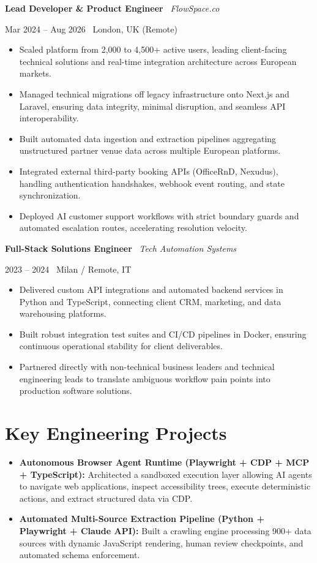 \documentclass[a4paper,10pt]{article}
\newcommand{\role}[4]{%
  \vspace{2pt}\noindent
  \begin{minipage}[t]{0.70\textwidth}\raggedright\textbf{#1} \textbullet\ \textit{#3}\end{minipage}%
  \hfill
  \begin{minipage}[t]{0.28\textwidth}\raggedleft\footnotesize\color{gray}#2 \textbullet\ #4\end{minipage}%
  \vspace{1pt}%
}
\begin{document}
\vspace{3pt}
\role{Lead Developer \& Product Engineer}{Mar 2024 -- Aug 2026}{FlowSpace.co}{London, UK (Remote)}
\begin{itemize}
  \item Scaled platform from 2,000 to 4,500+ active users, leading client-facing technical solutions and real-time integration architecture across European markets.
  \item Managed technical migrations off legacy infrastructure onto Next.js and Laravel, ensuring data integrity, minimal disruption, and seamless API interoperability.
  \item Built automated data ingestion and extraction pipelines aggregating unstructured partner venue data across multiple European platforms.
  \item Integrated external third-party booking APIs (OfficeRnD, Nexudus), handling authentication handshakes, webhook event routing, and state synchronization.
  \item Deployed AI customer support workflows with strict boundary guards and automated escalation routes, accelerating resolution velocity.
\end{itemize}

\vspace{3pt}
\role{Full-Stack Solutions Engineer}{2023 -- 2024}{Tech Automation Systems}{Milan / Remote, IT}
\begin{itemize}
  \item Delivered custom API integrations and automated backend services in Python and TypeScript, connecting client CRM, marketing, and data warehousing platforms.
  \item Built robust integration test suites and CI/CD pipelines in Docker, ensuring continuous operational stability for client deliverables.
  \item Partnered directly with non-technical business leaders and technical engineering leads to translate ambiguous workflow pain points into production software solutions.
\end{itemize}

\section{Key Engineering Projects}
\begin{itemize}
  \item \textbf{Autonomous Browser Agent Runtime (Playwright + CDP + MCP + TypeScript):} Architected a sandboxed execution layer allowing AI agents to navigate web applications, inspect accessibility trees, execute deterministic actions, and extract structured data via CDP.
  \item \textbf{Automated Multi-Source Extraction Pipeline (Python + Playwright + Claude API):} Built a crawling engine processing 900+ data sources with dynamic JavaScript rendering, human review checkpoints, and automated schema enforcement.
\end{itemize}
\end{document}
